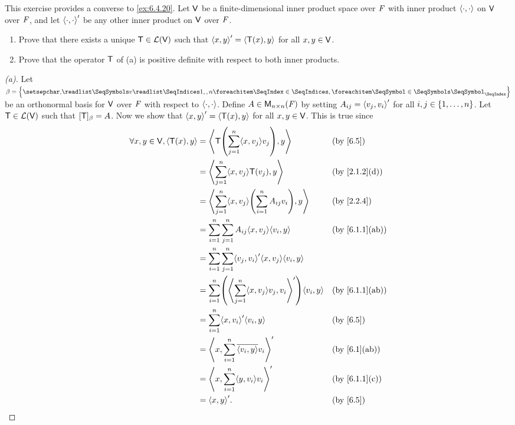 \begin{ex}\label{ex:6.4.22}
	This exercise provides a converse to \cref{ex:6.4.20}.
	Let \(\mathsf{V}\) be a finite-dimensional inner product space over \(\mathit{F}\) with inner product \(\left\langle\cdot, \cdot\right\rangle\) on \(\mathsf{V}\) over \(\mathit{F}\), and let \(\left\langle\cdot, \cdot\right\rangle'\) be any other inner product on \(\mathsf{V}\) over \(\mathit{F}\).
	\begin{enumerate}
		\item Prove that there exists a unique \(\mathsf{T} \in \mathcal{L}(\mathsf{V})\) such that \(\left\langle x, y\right\rangle' = \left\langle\mathsf{T}(x), y\right\rangle\) for all \(x, y \in \mathsf{V}\).
		\item Prove that the operator \(\mathsf{T}\) of (a) is positive definite with respect to both inner products.
	\end{enumerate}
\end{ex}

\begin{proof}[(a)]
	Let \(\beta = \set{\seq{v}{1,,n}}\) be an orthonormal basis for \(\mathsf{V}\) over \(\mathit{F}\) with respect to \(\left\langle\cdot, \cdot\right\rangle\).
	Define \(A \in \mathsf{M}_{{n} \times n}({\mathit{F}})\) by setting \(A_{i j} = \left\langle v_j, v_i\right\rangle'\) for all \(i, j \in \left\lbrace1, \dots, n\right\rbrace\).
	Let \(\mathsf{T} \in \mathcal{L}(\mathsf{V})\) such that \([\mathsf{T}]_{\beta} = A\).
	Now we show that \(\left\langle x, y\right\rangle' = \left\langle\mathsf{T}(x), y\right\rangle\) for all \(x, y \in \mathsf{V}\).
	This is true since
	\begin{align*}
		\forall x, y \in \V, \inn{\T(x), y} & = \inn{\T\pa{\sum_{j = 1}^n \inn{x, v_j} v_j}, y}                              &  & \by{6.5}       \\
		                                    & = \inn{\sum_{j = 1}^n \inn{x, v_j} \T(v_j), y}                                 &  & \by{2.1.2}[d]  \\
		                                    & = \inn{\sum_{j = 1}^n \inn{x, v_j} \pa{\sum_{i = 1}^n A_{i j} v_i}, y}         &  & \by{2.2.4}     \\
		                                    & = \sum_{i = 1}^n \sum_{j = 1}^n A_{i j} \inn{x, v_j} \inn{v_i, y}              &  & \by{6.1.1}[ab] \\
		                                    & = \sum_{i = 1}^n \sum_{j = 1}^n \inn{v_j, v_i}' \inn{x, v_j} \inn{v_i, y}                          \\
		                                    & = \sum_{i = 1}^n \pa{\inn{\sum_{j = 1}^n \inn{x, v_j} v_j, v_i}'} \inn{v_i, y} &  & \by{6.1.1}[ab] \\
		                                    & = \sum_{i = 1}^n \inn{x, v_i}' \inn{v_i, y}                                    &  & \by{6.5}       \\
		                                    & = \inn{x, \sum_{i = 1}^n \conj{\inn{v_i, y}} v_i}'                             &  & \by{6.1}[ab]   \\
		                                    & = \inn{x, \sum_{i = 1}^n \inn{y, v_i} v_i}'                                    &  & \by{6.1.1}[c]  \\
		                                    & = \inn{x, y}'.                                                                 &  & \by{6.5}
	\end{align*}


\end{proof}

